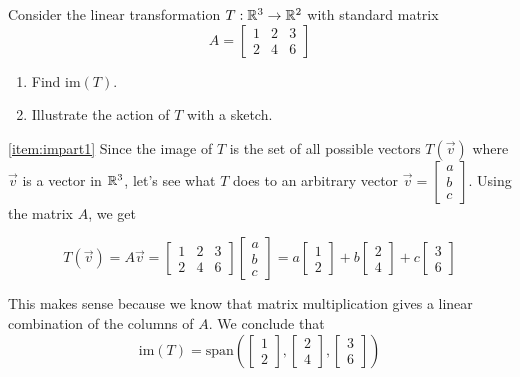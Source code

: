 \documentclass{ximera}
\begin{document}
\begin{example}\label{ex:image1}
Consider the linear transformation $T:\mathbb{R}^3\rightarrow \mathbb{R}^2$ with standard matrix
$$A=\begin{bmatrix}1&2&3\\2&4&6\end{bmatrix}$$
 
\begin{enumerate}
\item\label{item:impart1}
Find $\mbox{im}(T)$.
\item\label{item:impart2}
Illustrate the action of $T$ with a sketch.
 
\end{enumerate}
\begin{explanation}
 
\ref{item:impart1} Since the image of $T$ is the set of all possible vectors $T(\vec{v})$ where $\vec{v}$ is a vector in $\mathbb{R}^3$, let's see what $T$ does to an arbitrary vector $\vec{v}=\begin{bmatrix}a\\b\\c\end{bmatrix}$. Using the matrix $A$, we get 
 
$$T(\vec{v})=A\vec{v}=\begin{bmatrix}1&2&3\\2&4&6\end{bmatrix}\begin{bmatrix}a\\b\\c\end{bmatrix}=a\begin{bmatrix}1\\2\end{bmatrix}+b\begin{bmatrix}2\\4\end{bmatrix}+c\begin{bmatrix}3\\6\end{bmatrix}$$
 
This makes sense because we know that matrix multiplication gives a linear combination of the columns of $A$.  We conclude that
$$\mbox{im}(T)=\mbox{span}\left(\begin{bmatrix}1\\2\end{bmatrix}, \begin{bmatrix}2\\4\end{bmatrix}, \begin{bmatrix}3\\6\end{bmatrix}\right)$$
 

\end{explanation}
\end{example}
\end{document}
